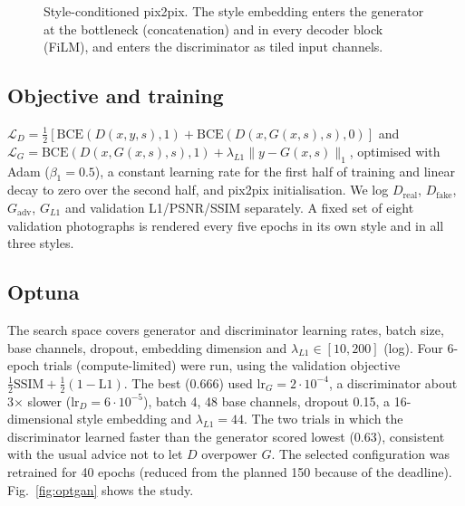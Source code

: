 ﻿\documentclass[conference]{IEEEtran}
\begin{document}
\begin{figure}[t]\centering
{}
\caption{Style-conditioned pix2pix. The style embedding enters the generator at the bottleneck
(concatenation) and in every decoder block (FiLM), and enters the discriminator as tiled input
channels.}
\label{fig:gan}
\end{figure}

\subsection{Objective and training}
$\mathcal{L}_D=\tfrac12[\text{BCE}(D(x,y,s),1)+\text{BCE}(D(x,G(x,s),s),0)]$ and
$\mathcal{L}_G=\text{BCE}(D(x,G(x,s),s),1)+\lambda_{L1}\lVert y-G(x,s)\rVert_1$, optimised with Adam
($\beta_1=0.5$), a constant learning rate for the first half of training and linear decay to zero over
the second half, and pix2pix initialisation. We log $D_{\text{real}}$, $D_{\text{fake}}$, $G_{\text{adv}}$,
$G_{L1}$ and validation L1/PSNR/SSIM separately. A fixed set of eight validation photographs is
rendered every five epochs in its own style and in all three styles.

\subsection{Optuna}
The search space covers generator and discriminator learning rates, batch size, base channels,
dropout, embedding dimension and $\lambda_{L1}\in[10,200]$ (log). Four 6-epoch trials
(compute-limited) were run, using the validation objective $\frac12\text{SSIM}+\frac12(1-\text{L1})$. The best
(0.666) used $\text{lr}_G=2{\cdot}10^{-4}$, a discriminator about 3$\times$ slower
($\text{lr}_D=6{\cdot}10^{-5}$), batch 4, 48 base channels, dropout 0.15, a 16-dimensional style embedding and
$\lambda_{L1}=44$. The two trials in which the discriminator learned faster than the generator scored
lowest (0.63), consistent with the usual advice not to let $D$ overpower $G$. The selected
configuration was retrained for 40 epochs (reduced from the planned 150 because of the deadline).
Fig.~\ref{fig:optgan} shows the study.
\end{document}
